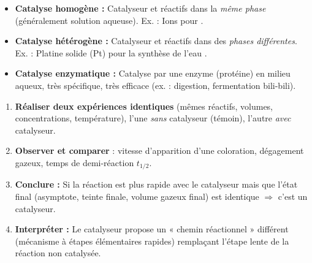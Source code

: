\documentclass[11pt]{article}
\begin{document}
\begin{definition}
\begin{itemize}
\item \textbf{Catalyse homogène :} Catalyseur et réactifs dans la \emph{même phase} (généralement solution aqueuse).
      Ex. : Ions  pour .
\item \textbf{Catalyse hétérogène :} Catalyseur et réactifs dans des \emph{phases différentes}.
      Ex. : Platine solide (Pt) pour la synthèse de l'eau .
\item \textbf{Catalyse enzymatique :} Catalyse par une enzyme (protéine) en milieu aqueux, très spécifique, très efficace (ex. : digestion, fermentation bili-bili).
\end{itemize}
\end{definition}

\begin{methode}
\begin{enumerate}
\item \textbf{Réaliser deux expériences identiques} (mêmes réactifs, volumes, concentrations, température), l'une \emph{sans} catalyseur (témoin), l'autre \emph{avec} catalyseur.
\item \textbf{Observer et comparer} : vitesse d'apparition d'une coloration, dégagement gazeux, temps de demi-réaction $t_{1/2}$.
\item \textbf{Conclure :} Si la réaction est plus rapide avec le catalyseur mais que l'état final (asymptote, teinte finale, volume gazeux final) est identique $\Rightarrow$ c'est un catalyseur.
\item \textbf{Interpréter :} Le catalyseur propose un « chemin réactionnel » différent (mécanisme à étapes élémentaires rapides) remplaçant l'étape lente de la réaction non catalysée.
\end{enumerate}
\end{methode}
\end{document}
